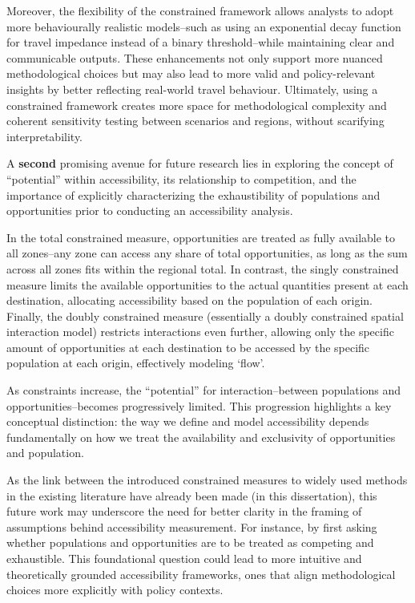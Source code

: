 \documentclass[
11pt, %
oneside, %
english, %
singlespacing, %
]{macthesis} %
\begin{document}
Moreover, the flexibility of the constrained framework allows analysts to adopt more behaviourally realistic models--such as using an exponential decay function for travel impedance instead of a binary threshold--while maintaining clear and communicable outputs. These enhancements not only support more nuanced methodological choices but may also lead to more valid and policy-relevant insights by better reflecting real-world travel behaviour. Ultimately, using a constrained framework creates more space for methodological complexity and coherent sensitivity testing between scenarios and regions, without scarifying interpretability.

A \textbf{second} promising avenue for future research lies in exploring the concept of ``potential'' within accessibility, its relationship to competition, and the importance of explicitly characterizing the exhaustibility of populations and opportunities prior to conducting an accessibility analysis.

In the total constrained measure, opportunities are treated as fully available to all zones--any zone can access any share of total opportunities, as long as the sum across all zones fits within the regional total. In contrast, the singly constrained measure limits the available opportunities to the actual quantities present at each destination, allocating accessibility based on the population of each origin. Finally, the doubly constrained measure (essentially a doubly constrained spatial interaction model) restricts interactions even further, allowing only the specific amount of opportunities at each destination to be accessed by the specific population at each origin, effectively modeling `flow'.

As constraints increase, the ``potential'' for interaction--between populations and opportunities--becomes progressively limited. This progression highlights a key conceptual distinction: the way we define and model accessibility depends fundamentally on how we treat the availability and exclusivity of opportunities and population.

As the link between the introduced constrained measures to widely used methods in the existing literature have already been made (in this dissertation), this future work may underscore the need for better clarity in the framing of assumptions behind accessibility measurement. For instance, by first asking whether populations and opportunities are to be treated as competing and exhaustible. This foundational question could lead to more intuitive and theoretically grounded accessibility frameworks, ones that align methodological choices more explicitly with policy contexts.
\end{document}
